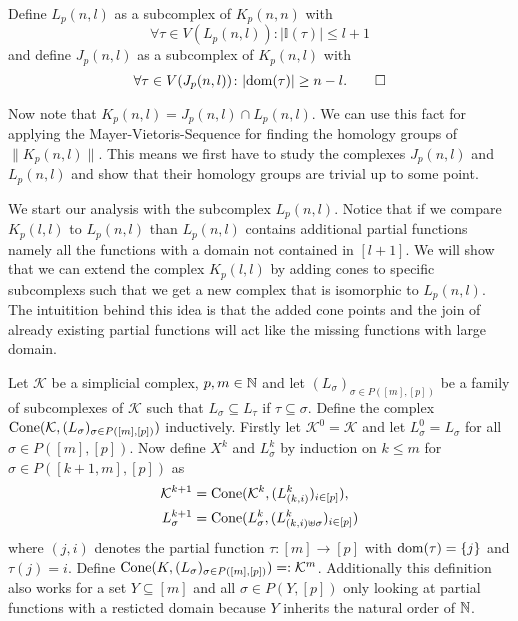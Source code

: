 \begin{defin}
  Define $L_p(n,l)$ as a subcomplex of $K_p(n,n)$ with \[\forall\tau\in V(L_p(n,l))\colon |\mathbb{I}(\tau)| \leq l+1 \]
  and define $J_p(n,l)$ as a subcomplex of $K_p(n,l)$ with \[\forall \tau \in V(J_p(n,l))\colon |{\rm dom}(\tau)| \geq n-l.\qedhere\]
\end{defin}

Now note that $K_p(n,l) = J_p(n,l) \cap L_p(n,l)$. We can use this fact for applying the Mayer-Vietoris-Sequence for finding the homology groups of $\lVert K_p(n,l)\rVert$. This means we first have to study the complexes $J_p(n,l)$ and $L_p(n,l)$ and show that their homology groups are trivial up to some point.

We start our analysis with the subcomplex $L_p(n,l)$. Notice that if we compare $K_p(l,l)$ to $L_p(n,l)$ than $L_p(n,l)$ contains additional partial functions namely all the functions with a domain not contained in $[l+1]$. We will show that we can extend the complex $K_p(l,l)$ by adding cones to specific subcomplexs such that we get a new complex that is isomorphic to $L_p(n,l)$. The intuitition behind this idea is that the added cone points and the join of already existing partial functions will act like the missing functions with large domain. 

\begin{defin}
  Let $\mathcal{K}$ be a simplicial complex, $p,m \in \mathbb{N}$ and let $(L_\sigma)_{\sigma \in P([m],[p])}$ be a family of subcomplexes of $\mathcal{K}$ such that $L_\sigma \subseteq L_\tau$ if $\tau \subseteq \sigma$. Define the complex ${\rm Cone}(\mathcal{K}, (L_\sigma)_{\sigma\in P([m],[p])})$ inductively. Firstly let $\mathcal{K}^0 = \mathcal{K}$ and let $L_\sigma^0 = L_\sigma$ for all $\sigma \in P([m],[p])$. Now define $X^k$ and $L_\sigma^k$ by induction on $k \leq m$ for $\sigma \in P([k+1,m], [p])$ as
  \begin{align*}
    \mathcal{K}^{k+1} &= {\rm Cone}(\mathcal{K}^k, (L^k_{(k,i)})_{i\in [p]}), \\
    L^{k+1}_\sigma &= {\rm Cone}(L^k_\sigma, (L^k_{(k,i) \uplus \sigma})_{i\in [p]})
  \end{align*}
  where $(j,i)$ denotes the partial function $\tau\colon [m] \to [p]$ with ${\rm dom}(\tau) = \{j\}$ and $\tau(j) = i$. Define ${\rm Cone}(K, (L_\sigma)_{\sigma \in P([m],[p])}) =: \mathcal{K}^m$.
  Additionally this definition also works for a set $Y \subseteq [m]$ and all $\sigma \in P(Y, [p])$ only looking at partial functions with a resticted domain because $Y$ inherits the natural order of $\mathbb{N}$.
\end{defin}

